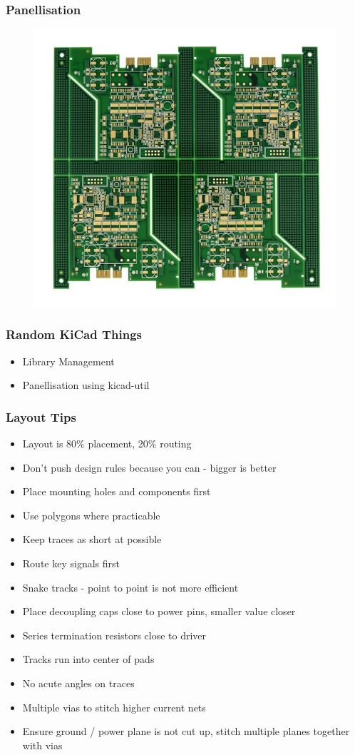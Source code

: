 \documentclass[t]{beamer}
\begin{document}
\begin{frame}
	\frametitle{Panellisation}
	\begin{figure}
		\includegraphics[width=0.7\linewidth]{panel.jpg}
	\end{figure}
\end{frame}
\begin{frame}
	\frametitle{Random KiCad Things}
	\begin{itemize}
		\item Library Management
		\item Panellisation using kicad-util
	\end{itemize}
\end{frame}
\begin{frame}
	\frametitle{Layout Tips}
	\begin{itemize}
		\item Layout is 80\% placement, 20\% routing
		\item Don't push design rules because you can - bigger is better
		\item Place mounting holes and components first
		\item Use polygons where practicable 
		\item Keep traces as short at possible
		\item Route key signals first
		\item Snake tracks - point to point is not more efficient
		\item Place decoupling caps close to power pins, smaller value closer
		\item Series termination resistors close to driver
		\item Tracks run into center of pads
		\item No acute angles on traces
		\item Multiple vias to stitch higher current nets
		\item Ensure ground / power plane is not cut up, stitch multiple planes together with vias
	\end{itemize}
\end{frame}
\end{document}
